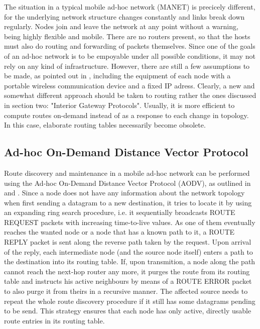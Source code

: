 \documentclass{acm_proc_article-sp}
\begin{document}
The situation in a typical mobile ad-hoc network (MANET) is precicely different, for the underlying network structure changes constantly and links break down regularly. Nodes join and leave the network at any point without a warning, being highly flexible and mobile. There are no routers present, so that the hosts must also do routing and forwarding of packets themselves. Since one of the goals of an ad-hoc network is to be empoyable under all possible conditions, it may not rely on any kind of infrastructure. However, there are still a few assumptions to be made, as pointed out in \cite{haas}, including the equipment of each node with a portable wireless communication device and a fixed IP adress. Clearly, a new and somewhat different approach should be taken to routing rather the ones discussed in section two: "Interior Gateway Protocols". Usually, it is more efficient to compute routes on-demand instead of as a response to each change in topology. In this case, elaborate routing tables necessarily become obsolete.

\subsection{Ad-hoc On-Demand Distance Vector Protocol}

Route discovery and maintenance in a mobile ad-hoc network can be performed using the Ad-hoc On-Demand Distance Vector Protocol (AODV), as outlined in \cite{haas} and \cite{perkins}. Since a node does not have any information about the network topology when first sending a datagram to a new destination, it tries to locate it by using an expanding ring search procedure, i.e. it sequentially broadcasts ROUTE REQUEST packets with increasing time-to-live values. As one of them eventually reaches the wanted node or a node that has a known path to it, a ROUTE REPLY packet is sent along the reverse path taken by the request. Upon arrival of the reply, each intermediate node (and the source node itself) enters a path to the destination into its routing table. If, upon transmition, a node along the path cannot reach the next-hop router any more, it purges the route from its routing table and instructs his active neighbours by means of a ROUTE ERROR packet to also purge it from theirs in a recursive manner. The affected source needs to repeat the whole route discovery procedure if it still has some datagrams pending to be send. This strategy ensures that each node has only active, directly usable route entries in its routing table.
\end{document}
